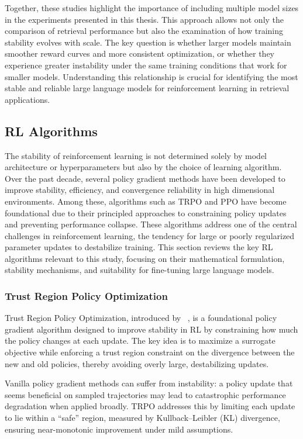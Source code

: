 Together, these studies highlight the importance of including multiple model sizes in the experiments presented in this thesis. This approach allows not only the comparison of retrieval performance but also the examination of how training stability evolves with scale. The key question is whether larger models maintain smoother reward curves and more consistent optimization, or whether they experience greater instability under the same training conditions that work for smaller models. Understanding this relationship is crucial for identifying the most stable and reliable large language models for reinforcement learning in retrieval applications.

\subsection{RL Algorithms}
The stability of reinforcement learning is not determined solely by model architecture or hyperparameters but also by the choice of learning algorithm. Over the past decade, several policy gradient methods have been developed to improve stability, efficiency, and convergence reliability in high dimensional environments. Among these, algorithms such as TRPO and PPO have become foundational due to their principled approaches to constraining policy updates and preventing performance collapse. These algorithms address one of the central challenges in reinforcement learning, the tendency for large or poorly regularized parameter updates to destabilize training. This section reviews the key RL algorithms relevant to this study, focusing on their mathematical formulation, stability mechanisms, and suitability for fine-tuning large language models.

\subsubsection{Trust Region Policy Optimization}
Trust Region Policy Optimization, introduced by \citeauthor{schulman2015trust}~\cite{schulman2015trust}, is a foundational policy gradient algorithm designed to improve stability in RL by constraining how much the policy changes at each update. The key idea is to maximize a surrogate objective while enforcing a trust region constraint on the divergence between the new and old policies, thereby avoiding overly large, destabilizing updates.

Vanilla policy gradient methods can suffer from instability: a policy update that seems beneficial on sampled trajectories may lead to catastrophic performance degradation when applied broadly. TRPO addresses this by limiting each update to lie within a “safe” region, measured by Kullback–Leibler (KL) divergence, ensuring near-monotonic improvement under mild assumptions.

